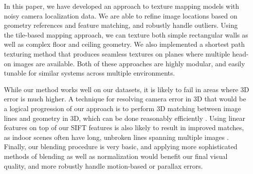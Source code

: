 \documentclass[]{spie}  %
\begin{document}
In this paper, we have developed an approach to texture mapping models
with noisy camera localization data. We are able to refine image
locations based on geometry references and feature matching, and
robustly handle outliers. Using the tile-based mapping approach, we
can texture both simple rectangular walls as well as complex floor and
ceiling geometry. We also implemented a shortest path texturing method
that produces seamless textures on planes where multiple head-on
images are available. Both of these approaches are highly modular, and
easily tunable for similar systems across multiple environments.

While our method works well on our datasets, it is likely to fail in
areas where 3D error is much higher. A technique for resolving camera
error in 3D that would be a logical progression of our approach is to
perform 3D matching between image lines and geometry in 3D, which can
be done reasonably efficiently \cite{linebased,
  rectangularstructures}. Using linear features on top of our SIFT
features is also likely to result in improved matches, as indoor
scenes often have long, unbroken lines spanning multiple images
\cite{linearposeestimation}. Finally, our blending procedure is very
basic, and applying more sophisticated methods of blending as well as
normalization would benefit our final visual quality, and more
robustly handle motion-based or parallax errors.
\end{document}
